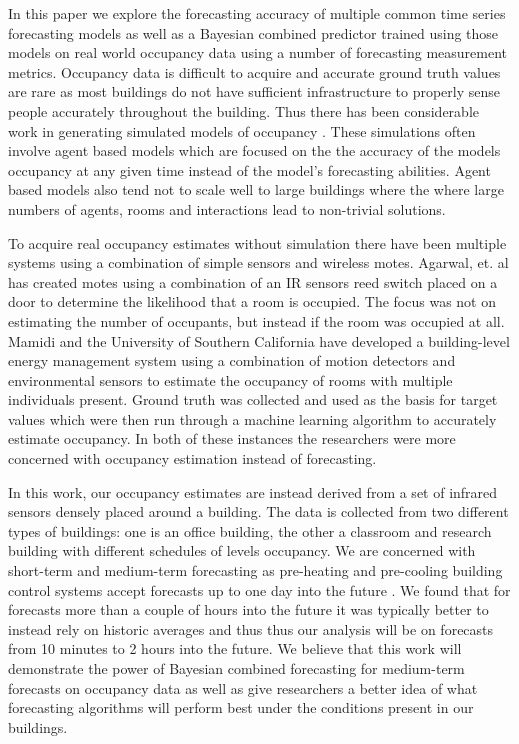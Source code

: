 \documentclass{acm_proc_article-sp}
\begin{document}
In this paper we explore the forecasting accuracy of multiple common time series forecasting models as well as a Bayesian combined predictor trained using those models on real world occupancy data using a number of forecasting measurement metrics.  Occupancy data is difficult to acquire and accurate ground truth values are rare as most buildings do not have sufficient infrastructure to properly sense people accurately throughout the building.  Thus there has been considerable work in generating simulated models of occupancy \cite{PAGE2008, GOLDSTEIN2010}.  These simulations often involve agent based models which are focused on the the accuracy of the models occupancy at any given time instead of the model's forecasting abilities.   Agent based models also tend not to scale well to large buildings where the where large numbers of agents, rooms and interactions lead to non-trivial solutions. 

To acquire real occupancy estimates without simulation there have been multiple systems using a combination of simple sensors and wireless motes.  Agarwal, et. al \cite{Agarwal2010} has created motes using a combination of an IR sensors reed switch placed on a door to determine the likelihood that a room is occupied.  The focus was not on estimating the number of occupants, but instead if the room was occupied at all.  Mamidi \cite{Mamidi2012} and the University of Southern California have developed a building-level energy management system using a combination of motion detectors and environmental sensors to estimate the occupancy of rooms with multiple individuals present.  Ground truth was collected and used as the basis for target values which were then run through a machine learning algorithm to accurately estimate occupancy.  In both of these instances the researchers were more concerned with occupancy estimation instead of forecasting.

In this work, our occupancy estimates are instead derived from a set of infrared sensors densely placed around a building.  The data is collected from two different types of buildings: one is an office building, the other a classroom and research building with different schedules of levels occupancy.  We are concerned with short-term and medium-term forecasting as pre-heating and pre-cooling building control systems accept forecasts up to one day into the future \cite{Ma2010}.  We found that for forecasts more than a couple of hours into the future it was typically better to instead rely on historic averages and thus thus our analysis will be on forecasts from 10 minutes to 2 hours into the future.  We believe that this work will demonstrate the power of Bayesian combined forecasting for medium-term forecasts on occupancy data as well as give researchers a better idea of what forecasting algorithms will perform best under the conditions present in our buildings.  
\end{document}
